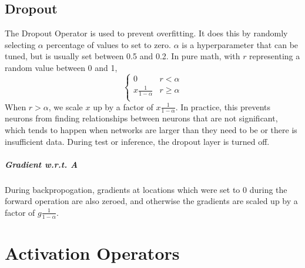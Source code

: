 \documentclass{report}
\begin{document}
        \section{Dropout}
            The Dropout Operator is used to prevent overfitting.  It does this by randomly selecting $\alpha$ percentage of values to set
            to zero. $\alpha$ is a hyperparameter that can be tuned, but is usually set between 0.5 and 0.2. In pure math, with $r$ representing
            a random value between 0 and 1,
            \[ \begin{cases} 
                0 & r < \alpha \\
                x\frac{1}{1 - \alpha} & r \ge \alpha \\
             \end{cases}
            \]
            When $r > \alpha$, we scale $x$ up by a factor of $x\frac{1}{1 - \alpha}$. In practice, this prevents neurons from finding
            relationships between neurons that are not significant, which tends to happen when networks are larger than they need to be or there
            is insufficient data. During test or inference, the dropout layer is turned off. 

            \paragraph{Gradient w.r.t. A}
            During backpropogation, gradients at locations which were set to 0 during the forward operation are also zeroed, and otherwise the gradients
            are scaled up by a factor of $g\frac{1}{1 - \alpha}$.

    \chapter{Activation Operators}
\end{document}
